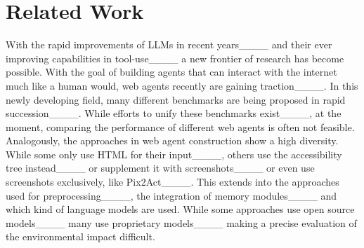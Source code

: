 \section{Related Work}
With the rapid improvements of LLMs in recent years____ and their ever improving capabilities in tool-use____ a new frontier of research has become possible. With the goal of building agents that can interact with the internet much like a human would, web agents recently are gaining traction____. In this newly developing field, many different benchmarks are being proposed in rapid succession____. While efforts to unify these benchmarks exist____, at the moment, comparing the performance of different web agents is often not feasible. 
Analogously, the approaches in web agent construction show a high diversity. While some only use HTML for their input____, others use the accessibility tree instead____ or supplement it with screenshots____ or even use screenshots exclusively, like Pix2Act____. This extends into the approaches used for preprocessing____, the integration of memory modules____ and which kind of language models are used. While some approaches use open source models____ many use proprietary models____ making a precise evaluation of the environmental impact difficult.


